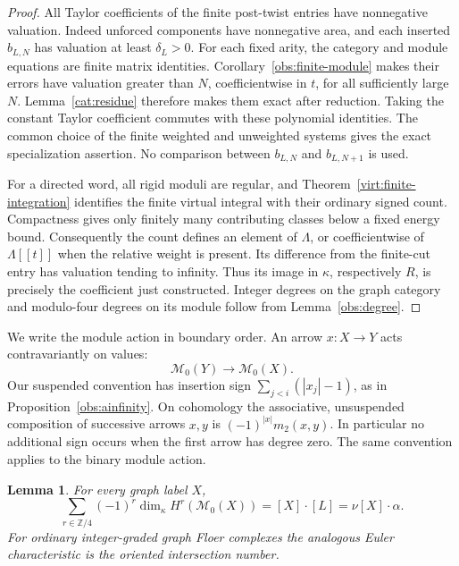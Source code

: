 \documentclass[11pt]{article}
\newtheorem{lemma}[theorem]{Lemma}
\theoremstyle{definition}
\theoremstyle{remark}
\newcommand{\Z}{\mathbb Z}
\numberwithin{equation}{section}
\begin{document}
\begin{proof}
All Taylor coefficients of the finite post-twist entries have
nonnegative valuation.  Indeed unforced components have nonnegative
area, and each inserted \(b_{L,N}\) has valuation at least
\(\delta_L>0\).  For each fixed arity, the category and module equations
are finite matrix identities.  Corollary~\ref{obs:finite-module}
makes their errors have valuation greater than \(N\), coefficientwise
in \(t\), for all sufficiently large \(N\).
Lemma~\ref{cat:residue} therefore makes them exact after reduction.
Taking the constant Taylor coefficient commutes with these polynomial
identities.  The common choice of the finite weighted and unweighted
systems gives the exact specialization assertion.  No comparison
between \(b_{L,N}\) and \(b_{L,N+1}\) is used.

For a directed word, all rigid moduli are regular, and
Theorem~\ref{virt:finite-integration} identifies the finite virtual
integral with their ordinary signed count.  Compactness gives only
finitely many contributing classes below a fixed energy bound.
Consequently the count defines an element of \(\Lambda\), or
coefficientwise of \(\Lambda[[t]]\) when the relative weight is present.
Its difference from the finite-cut entry has valuation tending to
infinity.  Thus its image in \(\kappa\), respectively \(R\), is precisely
the coefficient just constructed.  Integer degrees on the graph
category and modulo-four degrees on its module follow from
Lemma~\ref{obs:degree}.
\end{proof}

We write the module action in boundary order.  An arrow \(x:X\to Y\)
acts contravariantly on values:
\[
 \mathcal M_0(Y)\longrightarrow\mathcal M_0(X).
\]
Our suspended convention has insertion sign
\(\sum_{j<i}(|x_j|-1)\), as in Proposition~\ref{obs:ainfinity}.
On cohomology the associative, unsuspended composition of successive
arrows \(x,y\) is \((-1)^{|x|}m_2(x,y)\).
In particular no additional sign occurs when the first arrow has degree
zero.  The same convention applies to the binary module action.

\begin{lemma}\label{cat:euler}
For every graph label \(X\),
\begin{equation}\label{cat:euler-equation}
 \sum_{r\in\Z/4}(-1)^r
       \dim_\kappa H^r(\mathcal M_0(X))
   =[X]\cdot[L]=\nu[X]\cdot\alpha.
\end{equation}
For ordinary integer-graded graph Floer complexes the analogous Euler
characteristic is the oriented intersection number.
\end{lemma}
\end{document}
